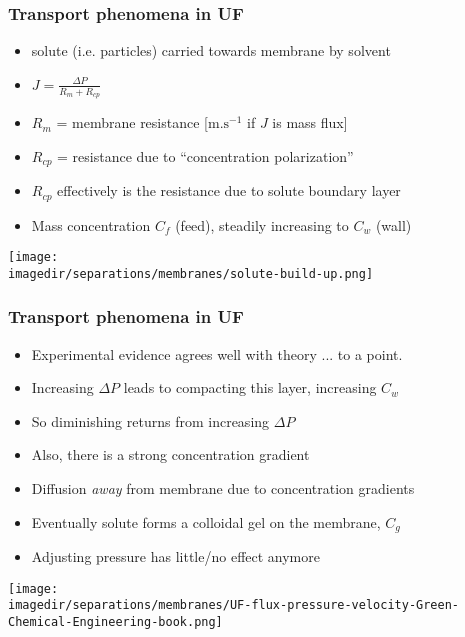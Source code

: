 \begin{frame}\frametitle{Transport phenomena in UF}
	\begin{itemize}		
		\item	solute (i.e. particles) carried towards membrane by solvent
		\item	$J = \displaystyle\frac{\Delta P}{R_m + R_{cp}}$
		\item	$R_m$ = membrane resistance [$\text{m.s}^{-1}$ if $J$ is mass flux] 
		\item	$R_{cp}$ = resistance due to ``concentration polarization''
		\item	$R_{cp}$ effectively is the resistance due to solute boundary layer
		\item	Mass concentration $C_f$ (feed), steadily increasing to $C_w$ (wall)
	\end{itemize}
	\begin{center}
		\texttt{[image: \\imagedir/separations/membranes/solute-build-up.png]}
	\end{center}	
\end{frame}

\begin{frame}\frametitle{Transport phenomena in UF}
	\begin{itemize}
		\item	Experimental evidence agrees well with theory ... to a point.
		\item	Increasing $\Delta P$ leads to compacting this layer, increasing $C_w$
		\item	So diminishing returns from increasing $\Delta P$
		\item	Also, there is a strong concentration gradient
		\item	Diffusion \emph{away} from membrane due to concentration gradients		
		\item	Eventually solute forms a colloidal gel on the membrane, $C_g$
		\item	Adjusting pressure has little/no effect anymore
	\end{itemize}
	\begin{center}
		\texttt{[image: \\imagedir/separations/membranes/UF-flux-pressure-velocity-Green-Chemical-Engineering-book.png]}
	\end{center}
\end{frame}

